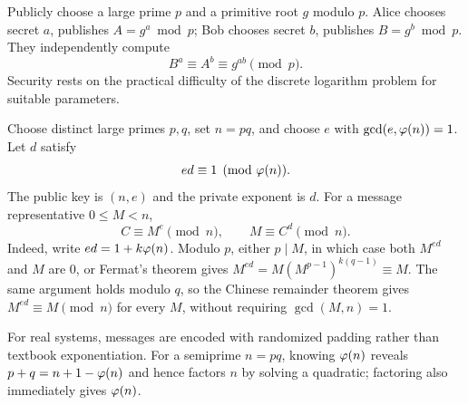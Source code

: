 \begin{app}
Publicly choose a large prime $p$ and a primitive root $g$ modulo $p$.  Alice chooses secret $a$, publishes $A=g^a\bmod p$; Bob chooses secret $b$, publishes $B=g^b\bmod p$.  They independently compute
\[
 B^a\equiv A^b\equiv g^{ab}\pmod p.
\]
Security rests on the practical difficulty of the discrete logarithm problem for suitable parameters.
\end{app}

\begin{app}[RSA]
Choose distinct large primes $p,q$, set $n=pq$, and choose $e$ with
$\gcd(e,\varphi(n))=1$.  Let $d$ satisfy
\[
 ed\equiv1\pmod{\varphi(n)}.
\]
The public key is $(n,e)$ and the private exponent is $d$.  For a message representative $0\le M<n$,
\[
 C\equiv M^e\pmod n,
 \qquad
 M\equiv C^d\pmod n.
\]
Indeed, write $ed=1+k\varphi(n)$.  Modulo $p$, either $p\mid M$, in which case both $M^{ed}$ and $M$ are $0$, or Fermat's theorem gives
$M^{ed}=M(M^{p-1})^{k(q-1)}\equiv M$.  The same argument holds modulo $q$, so the Chinese remainder theorem gives $M^{ed}\equiv M\pmod n$ for every $M$, without requiring $\gcd(M,n)=1$.

For real systems, messages are encoded with randomized padding rather than textbook exponentiation.  For a semiprime $n=pq$, knowing $\varphi(n)$ reveals
$p+q=n+1-\varphi(n)$ and hence factors $n$ by solving a quadratic; factoring also immediately gives $\varphi(n)$.
\end{app}
